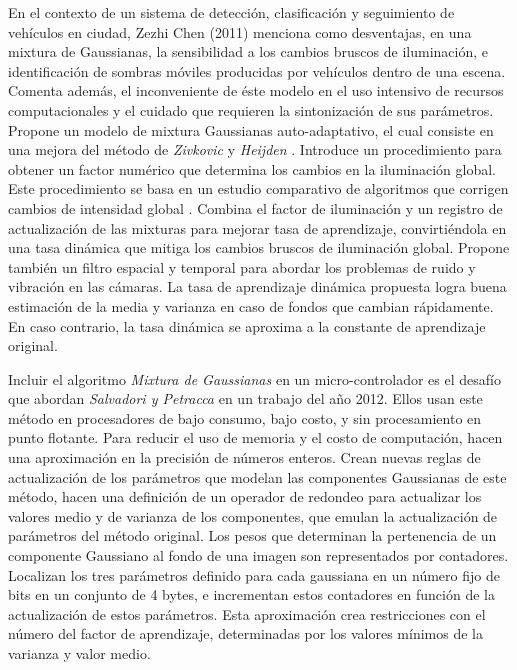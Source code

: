 \indent En el contexto de un sistema de detección, clasificación y seguimiento de vehículos \cite{chen_vehicle_2012} en ciudad,  Zezhi Chen \cite{chen_self-adaptive_2011} (2011) menciona como desventajas, en una mixtura de Gaussianas, la sensibilidad a los cambios bruscos de iluminación, e identificación de sombras móviles producidas por vehículos dentro de una escena. Comenta además, el inconveniente de éste modelo en el uso intensivo de recursos computacionales y el cuidado que requieren la sintonización de sus parámetros. Propone un modelo de mixtura Gaussianas auto-adaptativo, el cual consiste en una mejora del método de \textit{Zivkovic} y \textit{Heijden} \cite{zivkovic_efficient_2006}. Introduce un procedimiento para obtener un factor numérico que determina los cambios en la iluminación global. Este procedimiento se basa en un estudio comparativo de algoritmos que corrigen cambios de intensidad global \cite{withagen_intensity_2010}. Combina el factor de iluminación y un registro de actualización de las mixturas para mejorar tasa de aprendizaje, convirtiéndola en una tasa dinámica que mitiga los cambios bruscos de iluminación global. Propone también un filtro espacial y temporal \cite{chen_background_2009} para abordar los problemas de ruido y vibración en las cámaras. La tasa de aprendizaje dinámica propuesta logra buena estimación de la media y varianza en caso de fondos que cambian rápidamente. En caso contrario, la tasa dinámica se aproxima a la constante de aprendizaje original\cite{zivkovic_efficient_2006}.

\indent Incluir el algoritmo \textit{Mixtura de Gaussianas} en un micro-controlador es el desafío que abordan \textit{Salvadori y Petracca} \cite{salvadori_gaussian_2012} en un trabajo del año 2012. Ellos usan este método en procesadores de bajo consumo, bajo costo, y sin procesamiento en punto flotante. Para reducir el uso de memoria y el costo de computación, hacen una aproximación en la precisión de números enteros. Crean nuevas reglas de actualización de los parámetros que modelan las componentes Gaussianas de este método, hacen una definición de un operador de redondeo para actualizar los valores medio y de varianza de los componentes, que emulan la actualización de parámetros del método original. Los pesos que determinan la pertenencia de un componente Gaussiano al fondo de una imagen son representados por contadores. Localizan los tres parámetros definido para cada gaussiana en un número fijo de bits en un conjunto de 4 bytes, e incrementan estos contadores en función de la actualización de estos parámetros. Esta aproximación crea restricciones con el número del factor de aprendizaje, determinadas por los valores mínimos de la varianza y valor medio.

